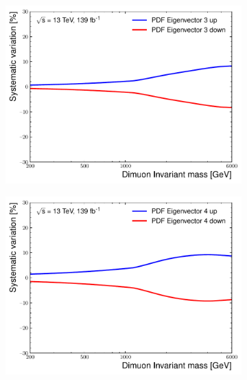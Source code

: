 \begin{figure}[h!]
\begin{subfigure}[b]{0.42\textwidth}
        \centering
        \includegraphics[width=\textwidth]{figures/analysis/datamc/Uncertainties/theory/mm/backgroundTemplate_KF_PDF_EV3.pdf}
        \label{fig:uncert:mmpdfvar3}
    \end{subfigure}
    \begin{subfigure}[b]{0.42\textwidth}
        \centering
        \includegraphics[width=\textwidth]{figures/analysis/datamc/Uncertainties/theory/mm/backgroundTemplate_KF_PDF_EV4.pdf}
        \label{fig:uncert:mmpdfvar4}
    \end{subfigure}
    \begin{subfigure}[b]{0.42\textwidth}
        \centering

\end{subfigure}
\end{figure}
